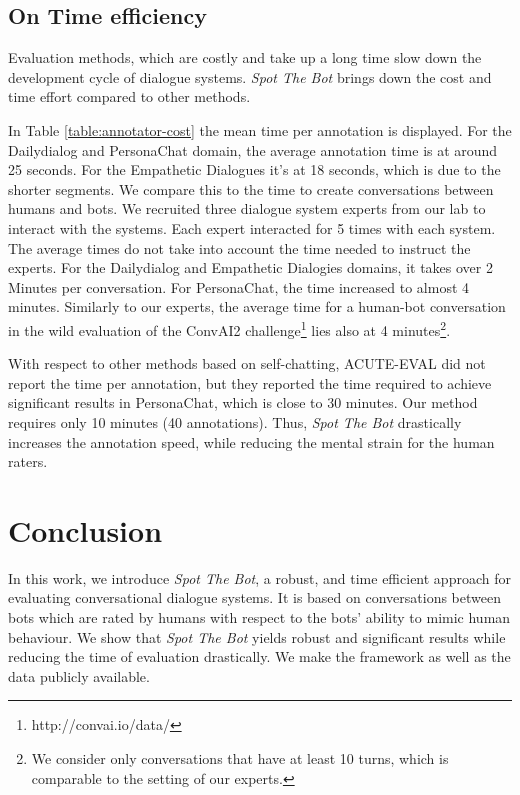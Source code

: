\documentclass[11pt,a4paper]{article}
\begin{document}
\subsection{On Time efficiency}
Evaluation methods, which are costly and take up a long time slow down the development cycle of dialogue systems. \emph{Spot The Bot} brings down the cost and time effort compared to other methods. 

In Table \ref{table:annotator-cost} the mean time per annotation is displayed.  For the Dailydialog and PersonaChat domain, the average annotation time is at around 25 seconds. For the Empathetic Dialogues it's at 18 seconds, which is due to the shorter segments. We compare this to the time to create conversations between humans and bots. We recruited three dialogue system experts from our lab to interact with the systems. Each expert interacted for 5 times with each system. The average times do not take into account the time needed to instruct the experts. For the Dailydialog and Empathetic Dialogies domains, it takes over 2 Minutes per conversation. For PersonaChat, the time increased to almost 4 minutes. Similarly to our experts, the average time for a human-bot conversation in the wild evaluation of the ConvAI2 challenge\footnote{http://convai.io/data/} lies also at 4 minutes\footnote{We consider only conversations that have at least 10 turns, which is comparable to the setting of our experts.}.

With respect to other methods based on self-chatting, ACUTE-EVAL did not report the time per annotation, but they reported the time required to achieve significant results in PersonaChat, which is close to 30 minutes. Our method requires only 10 minutes (40 annotations). Thus, \emph{Spot The Bot} drastically increases the annotation speed, while reducing the mental strain for the human raters.


\section{Conclusion}
In this work, we introduce \emph{Spot The Bot}, a robust, and time efficient approach for evaluating conversational dialogue systems. It is based on conversations between bots which are rated by humans with respect to the bots' ability to mimic human behaviour. We show that \emph{Spot The Bot} yields robust and significant results while reducing the time of evaluation drastically. We make the framework as well as the data publicly available. 
\end{document}
